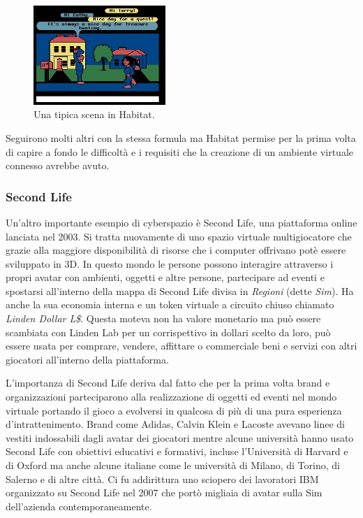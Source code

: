         \begin{figure}[h!]
            \centering
            \includegraphics[width=5cm]{figure/lessonshabitat.jpg}
            \caption{Una tipica scena in Habitat.}
        \end{figure}

        Seguirono molti altri con la stessa formula ma Habitat permise per la prima volta di capire a fondo le difficoltà e i requisiti che la creazione di un ambiente virtuale connesso avrebbe avuto. \cite{Habitat1990}
         
        \subsubsection{Second Life}

        Un'altro importante esempio di cyberspazio è Second Life, una piattaforma online lanciata nel 2003.
        Si tratta nuovamente di uno spazio virtuale multigiocatore che grazie alla maggiore disponibilità di risorse che i computer offrivano potè essere sviluppato in 3D.
        In questo mondo le persone possono interagire attraverso i propri avatar con ambienti, oggetti e altre persone, partecipare ad eventi e spostarsi all'interno della mappa di Second Life divisa in \textit{Regioni} (dette \textit{Sim}).
        Ha anche la sua economia interna e un token virtuale a circuito chiuso chiamato \textit{Linden Dollar L\$}. 
        Questa moteva non ha valore monetario ma può essere scambiata con Linden Lab per un corrispettivo in dollari scelto da loro, può essere usata per comprare, vendere, affittare o commerciale beni e servizi con altri giocatori all'interno della piattaforma.
        
        L'importanza di Second Life deriva dal fatto che per la prima volta brand e organizzazioni parteciparono alla realizzazione di oggetti ed eventi nel mondo virtuale portando il gioco a evolversi in qualcosa di più di una pura esperienza d'intrattenimento. 
        Brand come Adidas, Calvin Klein e Lacoste avevano linee di vestiti indossabili dagli avatar dei giocatori \cite{Fascion2nd} mentre alcune università hanno usato Second Life con obiettivi educativi e formativi, incluse l'Università di Harvard e di Oxford \cite{University2ndLife} ma anche alcune italiane come le università di Milano, di Torino, di Salerno e di altre città. \cite{UnitoIn2ndLife, 2ndLifeWikipedia} 
        Ci fu addirittura uno sciopero dei lavoratori IBM organizzato su Second Life nel 2007 che portò migliaia di avatar sulla Sim dell'azienda contemporaneamente. \cite{2ndLifeWikipedia}
        
